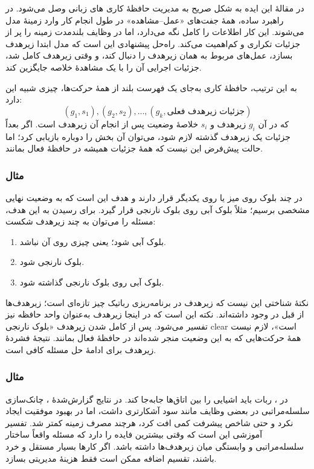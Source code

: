 در مقالهٔ  این ایده به شکل صریح به مدیریت حافظهٔ کاری های زبانی وصل می‌شود. در راهبرد ساده، همهٔ جفت‌های «عمل--مشاهده» در طول انجام کار وارد زمینهٔ مدل می‌شوند. این کار اطلاعات را کامل نگه می‌دارد، اما در وظایف بلندمدت زمینه را پر از جزئیات تکراری و کم‌اهمیت می‌کند. راه‌حل پیشنهادی این است که مدل ابتدا زیرهدف بسازد، عمل‌های مربوط به همان زیرهدف را دنبال کند، و وقتی زیرهدف کامل شد، جزئیات اجرایی آن را با یک مشاهدهٔ خلاصه جایگزین کند.

به این ترتیب، حافظهٔ کاری به‌جای یک فهرست بلند از همهٔ حرکت‌ها، چیزی شبیه این دارد:
\[
\left(g_1,s_1\right),\left(g_2,s_2\right),\ldots,\left(g_k,\text{جزئیات زیرهدف فعلی}\right)
\]
که در آن \(g_i\) زیرهدف و \(s_i\) خلاصهٔ وضعیت پس از انجام آن زیرهدف است. اگر بعداً جزئیات یک زیرهدف گذشته لازم شود، می‌توان آن بخش را دوباره بازیابی کرد؛ اما حالت پیش‌فرض این نیست که همهٔ جزئیات همیشه در حافظهٔ فعال بمانند.

\subsubsection{مثال }
در  چند بلوک روی میز یا روی یکدیگر قرار دارند و هدف این است که به وضعیت نهایی مشخصی برسیم؛ مثلاً بلوک آبی روی بلوک نارنجی قرار گیرد. برای رسیدن به این هدف، مسئله را می‌توان به چند زیرهدف شکست:
\begin{enumerate}
  \item بلوک آبی  شود؛ یعنی چیزی روی آن نباشد.
  \item بلوک نارنجی  شود.
  \item بلوک آبی روی بلوک نارنجی گذاشته شود.
\end{enumerate}

نکتهٔ شناختی این نیست که زیرهدف در برنامه‌ریزی رباتیک چیز تازه‌ای است؛ زیرهدف‌ها از قبل در  وجود داشته‌اند. نکته این است که در اینجا زیرهدف به‌عنوان واحد حافظه نیز تفسیر می‌شود. پس از کامل شدن زیرهدف «بلوک نارنجی clear است»، لازم نیست همهٔ حرکت‌هایی که به این وضعیت منجر شده‌اند در حافظهٔ فعال بمانند. نتیجهٔ فشردهٔ زیرهدف برای ادامهٔ حل مسئله کافی است.

\subsubsection{مثال }
در ، ربات باید اشیایی را بین اتاق‌ها جابه‌جا کند. در نتایج گزارش‌شدهٔ ، چانک‌سازی سلسله‌مراتبی در بعضی وظایف مانند  سود آشکارتری داشت، اما در  بهبود موفقیت ایجاد نکرد و حتی شاخص پیشرفت کمی افت کرد، هرچند مصرف زمینه کمتر شد. تفسیر آموزشی این است که  وقتی بیشترین فایده را دارد که مسئله واقعاً ساختار سلسله‌مراتبی و وابستگی میان زیرهدف‌ها داشته باشد. اگر کارها بسیار مستقل و خرد باشند، تقسیم اضافه ممکن است فقط هزینهٔ مدیریتی بسازد.

